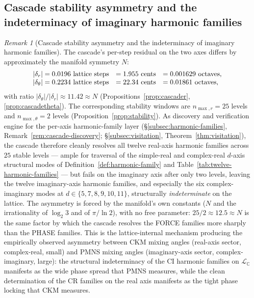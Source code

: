 \documentclass[11pt,a4paper]{article}
\theoremstyle{definition}
\theoremstyle{remark}
\newtheorem{remark}[theorem]{Remark}
\newcommand{\C}{\mathbb{C}}
\begin{document}
\subsection{Cascade stability asymmetry and the indeterminacy of imaginary harmonic families}\label{subsec:cascade-stability-asymmetry}

\begin{remark}[Cascade stability asymmetry and the indeterminacy of imaginary harmonic families]\label{rem:cascade-asymmetry-CI}
The cascade's per-step residual on the two axes differs by approximately the manifold symmetry $N$:
\[
\begin{array}{r@{\;=\;}l@{\quad}l@{\quad}l}
|\delta_{r}| & 0.0196 \text{ lattice steps} & = 1.955 \text{ cents}
             & = 0.001629 \text{ octaves,}\\
|\delta_{\theta}| & 0.2234 \text{ lattice steps} & = 22.34 \text{ cents}
                   & = 0.01861 \text{ octaves,}
\end{array}
\]
with ratio $|\delta_{\theta}|/|\delta_{r}| \approx 11.42 \approx N$ (Propositions~\ref{prop:cascader}, \ref{prop:cascadetheta}). The corresponding stability windows are $n_{\max,r} = 25$ levels and $n_{\max,\theta} = 2$ levels (Proposition~\ref{prop:stability}). As discovery and verification engine for the per-axis harmonic-family layer (\S\ref{subsec:harmonic-families}, Remark~\ref{rem:cascade-discovery}; \S\ref{subsec:visitation}, Theorem~\ref{thm:visitation}), the cascade therefore cleanly resolves all twelve real-axis harmonic families across $25$ stable levels --- ample for traversal of the simple-real and complex-real $d$-axis structural modes of Definition~\ref{def:harmonic-family} and Table~\ref{tab:twelve-harmonic-families} --- but fails on the imaginary axis after only two levels, leaving the twelve imaginary-axis harmonic families, and especially the six complex-imaginary modes at $d \in \{5,7,8,9,10,11\}$, structurally \emph{indeterminate} on the lattice. The asymmetry is forced by the manifold's own constants ($N$ and the irrationality of $\log_{2}3$ and of $\pi/\ln 2$), with no free parameter: $25/2 \approx 12.5 \approx N$ is the same factor by which the cascade resolves the FORCE families more sharply than the PHASE families. This is the lattice-internal mechanism producing the empirically observed asymmetry between CKM mixing angles (real-axis sector, complex-real, small) and PMNS mixing angles (imaginary-axis sector, complex-imaginary, large): the structural indeterminacy of the CI harmonic families on $\mathcal{L}_{\C}$ manifests as the wide phase spread that PMNS measures, while the clean determination of the CR families on the real axis manifests as the tight phase locking that CKM measures.
\end{remark}
\end{document}
